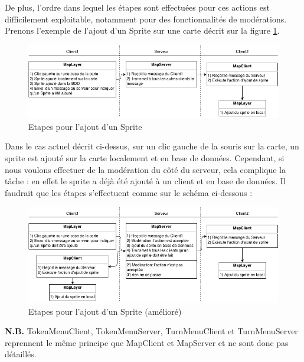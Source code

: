 De plus, l'ordre dans lequel les étapes sont effectuées pour ces actions est difficilement exploitable, notamment pour des fonctionnalités de modérations. Prenons l'exemple de l'ajout d'un Sprite sur une carte décrit sur la figure \ref{fig:network_addsprite}.

\begin{figure}[h!]
	\centering
	\includegraphics[width=1.0\textwidth]{img/network_addsprite.png}
	\caption{Etapes pour l'ajout d'un Sprite}
	\label{fig:network_addsprite}
\end{figure}

Dans le cas actuel décrit ci-dessus, sur un clic gauche de la souris sur la carte, un sprite est ajouté sur la carte localement et en base de données. Cependant, si nous voulons effectuer de la modération du côté du serveur, cela complique la tâche : en effet le sprite a déjà été ajouté à un client et en base de données. Il faudrait que les étapes s'effectuent comme sur le schéma ci-dessous :

\begin{figure}[h!]
	\centering
	\includegraphics[width=1.0\textwidth]{img/network_addsprite_better.png}
	\caption{Etapes pour l'ajout d'un Sprite (amélioré)}
\end{figure}

\textbf{N.B.} TokenMenuClient, TokenMenuServer, TurnMenuClient et TurnMenuServer reprennent le même principe que MapClient et MapServer et ne sont donc pas détaillés.

